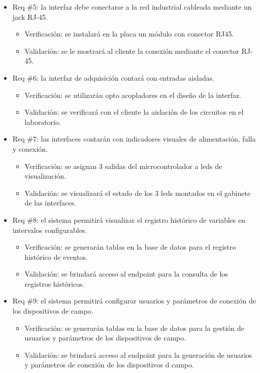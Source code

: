 \documentclass[
11pt%
]{charter}
\begin{document}
\begin{itemize}
\item Req \#5: la interfaz debe conectarse a la red industrial cableada mediante un jack RJ-45.

\begin{itemize}
	\item Verificación: se instalará en la placa un módulo con conector RJ45.  
	\item Validación: se le mostrará al cliente la conexión mediante el conector RJ-45.
\end{itemize}

\item Req \#6: la interfaz de adquisición contará con entradas aisladas.

\begin{itemize}
	\item Verificación: se utilizarán opto acopladores en el diseño de la interfaz.  
	\item Validación: se verificará con el cliente la aislación de los circuitos en el laboratorio.
\end{itemize}

\item Req \#7: las interfaces contarán con indicadores visuales de alimentación, falla y conexión.

\begin{itemize}
	\item Verificación: se asignan 3 salidas del microcontrolador a leds de visualización.  
	\item Validación: se visualizará el estado de los 3 leds montados en el gabinete de las interfaces.
\end{itemize}

\item Req \#8: el sistema permitirá visualizar el registro histórico de variables en intervalos configurables.

\begin{itemize}
	\item Verificación: se generarán tablas en la base de datos para el registro histórico de eventos.  
	\item Validación: se brindará acceso al endpoint para la consulta de los registros históricos.
\end{itemize}

\item Req \#9: el sistema permitirá configurar usuarios y parámetros de conexión de los dispositivos de campo.

\begin{itemize}
	\item Verificación: se generarán tablas en la base de datos para la gestión de usuarios y parámetros de los dispositivos de campo.  
	\item Validación: se brindará acceso al endpoint para la generación de usuarios y parámetros de conexión de los dispositivos d campo.
\end{itemize}


\end{itemize}
\end{document}

